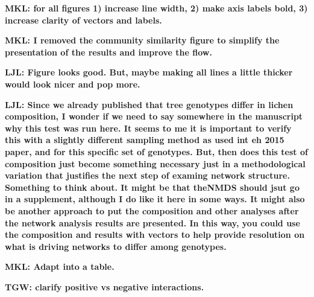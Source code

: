 \documentclass[9pt,twocolumn,twoside,lineno]{pnas-new}
\begin{document}
{\textbf{MKL: for all figures 1) increase line width, 2) make axis
  labels bold, 3) increase clarity of vectors and labels.}


\textbf{MKL: I removed the community similarity figure to simplify the
presentation of the results and improve the flow.}


\textbf{LJL: Figure looks good. But, maybe making all lines a little
  thicker would look nicer and pop more.}

\textbf{LJL: Since we already published that tree genotypes differ in
  lichen composition, I wonder if we need to say somewhere in the
  manuscript why this test was run here. It seems to me it is
  important to verify this with a slightly different sampling method
  as used int eh 2015 paper, and for this specific set of
  genotypes. But, then does this test of composition just become
  something necessary just in a methodological variation that
  justifies the next step of examing network structure.  Something to
  think about. It might be that theNMDS should jsut go in a
  supplement, although I do like it here in some ways.  It might also
  be another approach to put the composition and other analyses after
  the network analysis results are presented. In this way, you could
  use the composition and results with vectors to help provide
  resolution on what is driving networks to differ among genotypes.}


\textbf{MKL: Adapt into a table.}


\textbf{TGW: clarify positive vs negative interactions.}

}
\end{document}
